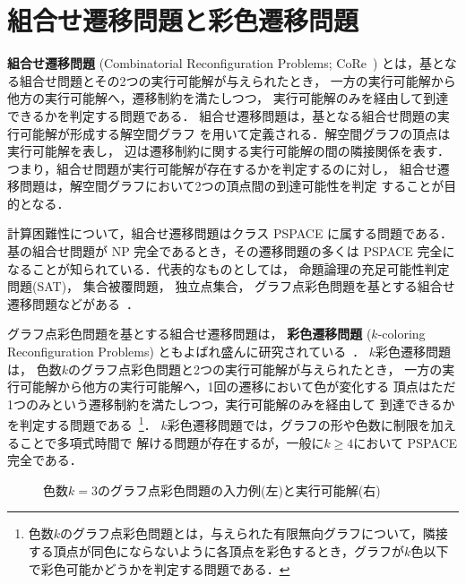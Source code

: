 ﻿\section{組合せ遷移問題と彩色遷移問題}\label{chap:background}

\textbf{組合せ遷移問題}
(Combinatorial Reconfiguration Problems;
CoRe~\cite{core:ItoDHPSUU11,core:Nishimura18,core:Heuvel13})
とは，基となる組合せ問題とその2つの実行可能解が与えられたとき，
一方の実行可能解から他方の実行可能解へ，遷移制約を満たしつつ，
実行可能解のみを経由して到達できるかを判定する問題である．
組合せ遷移問題は，基となる組合せ問題の実行可能解が形成する解空間グラフ
を用いて定義される．解空間グラフの頂点は実行可能解を表し，
辺は遷移制約に関する実行可能解の間の隣接関係を表す．
つまり，組合せ問題が実行可能解が存在するかを判定するのに対し，
組合せ遷移問題は，解空間グラフにおいて2つの頂点間の到達可能性を判定
することが目的となる．

計算困難性について，組合せ遷移問題はクラス PSPACE に属する問題である．
基の組合せ問題が NP 完全であるとき，その遷移問題の多くは PSPACE 完全に
なることが知られている．代表的なものとしては，
命題論理の充足可能性判定問題(SAT)，
集合被覆問題，
独立点集合，
グラフ点彩色問題を基とする組合せ遷移問題などがある~\cite{%
  core:gcp:BonsmaC09,%
  core:gcp:CerecedaHJ11,%
  core:sat:GopalanKMP09,%
  core:ItoDHPSUU11%
}．

グラフ点彩色問題を基とする組合せ遷移問題は，
\textbf{彩色遷移問題}
($k$-coloring Reconfiguration Problems)
ともよばれ盛んに研究されている~\cite{core:gcp:BonsmaC09,core:gcp:CerecedaHJ11}．
$k$彩色遷移問題は，
色数$k$のグラフ点彩色問題と2つの実行可能解が与えられたとき，
一方の実行可能解から他方の実行可能解へ，1回の遷移において色が変化する
頂点はただ1つのみという遷移制約を満たしつつ，実行可能解のみを経由して
到達できるかを判定する問題である~\footnote{%
色数$k$のグラフ点彩色問題とは，与えられた有限無向グラフについて，隣接
する頂点が同色にならないように各頂点を彩色するとき，グラフが$k$色以下
で彩色可能かどうかを判定する問題である．}．
$k$彩色遷移問題では，グラフの形や色数に制限を加えることで多項式時間で
解ける問題が存在するが，一般に$k \ge 4$において PSPACE 完全である．

\begin{figure}[t]
  \centering
  \scalebox{0.7}{}
  \quad
  \scalebox{0.7}{}
  \caption{色数$k=3$のグラフ点彩色問題の入力例(左)と実行可能解(右)}
  \label{fig:graph}
\end{figure}

